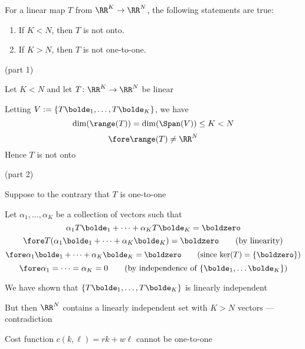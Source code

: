 \begin{frame}
    
    \vspace{2em}
    \Thm{\eqref{ET-t:lfoc}}
    For a linear map $T$ from $\RR^K \to \RR^N$, the following statements are
    true:
    \begin{enumerate}
        \item If $K < N$, then $T$ is not onto.
        \item If $K > N$, then $T$ is not one-to-one.
    \end{enumerate}
    \Prf(part 1)
    
    Let $K < N$ and let $T \colon \RR^K \to \RR^N$ be linear  
    
    Letting $V := \{T\bolde_1, \ldots, T\bolde_K\}$, we have
    $$
    \dim(\range(T)) = \dim(\Span(V)) \leq K < N
    $$
    $$
    \fore 
        \range(T) \not= \RR^N
    $$
    Hence $T$ is not onto 
    
\end{frame}

\begin{frame}
    
    \Prf(part 2)
    
    Suppose to the contrary that $T$ is one-to-one

    Let $\alpha_1, \ldots, \alpha_K$ be a collection of vectors such that 
    \[
    \alpha_1 T \bolde_1 + \cdots + \alpha_K T \bolde_K = \boldzero
    \]
    \[
    \fore 
    T (\alpha_1 \bolde_1 + \cdots + \alpha_K \bolde_K) = \boldzero
    \qquad (\text{by linearity})
    \]
    \[
    \fore
    \alpha_1 \bolde_1 + \cdots + \alpha_K \bolde_K = \boldzero
    \qquad (\text{since $\ker(T) = \{\boldzero\}$})
    \]
    \[
    \fore 
    \alpha_1 = \cdots = \alpha_K = 0
    \qquad (\text{by independence of $\{\bolde_1, \ldots \bolde_K\}$)}
    \]

    We have shown that $\{T\bolde_1, \ldots, T\bolde_K\}$ is linearly
    independent

    But then $\RR^N$ contains a linearly independent set
    with $K > N$ vectors --- contradiction

\end{frame}


\begin{frame}
    
    \begin{figure}
       \begin{center}
       \end{center}
    \end{figure}

   \Eg Cost function $c(k, \ell) = rk + w\ell$ cannot be one-to-one

\end{frame}

